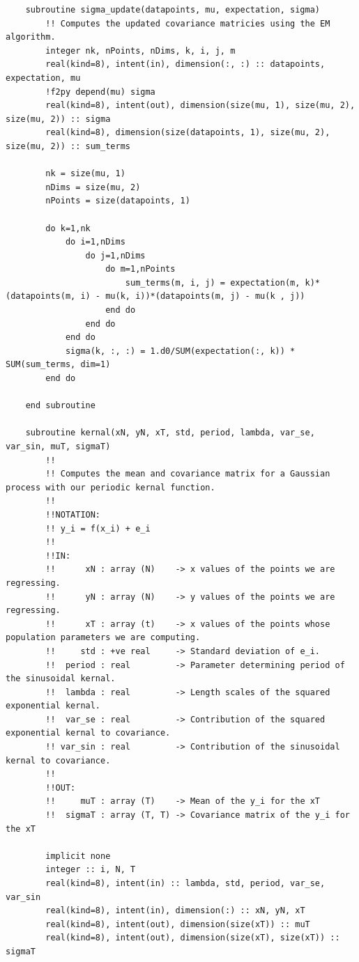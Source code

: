 \documentclass[a4paper]{article}
\begin{document}
\begin{verbatim}
    subroutine sigma_update(datapoints, mu, expectation, sigma)
        !! Computes the updated covariance matricies using the EM algorithm.
        integer nk, nPoints, nDims, k, i, j, m
        real(kind=8), intent(in), dimension(:, :) :: datapoints, expectation, mu
        !f2py depend(mu) sigma
        real(kind=8), intent(out), dimension(size(mu, 1), size(mu, 2), size(mu, 2)) :: sigma
        real(kind=8), dimension(size(datapoints, 1), size(mu, 2), size(mu, 2)) :: sum_terms

        nk = size(mu, 1)
        nDims = size(mu, 2)
        nPoints = size(datapoints, 1)

        do k=1,nk
            do i=1,nDims
                do j=1,nDims
                    do m=1,nPoints
                        sum_terms(m, i, j) = expectation(m, k)*(datapoints(m, i) - mu(k, i))*(datapoints(m, j) - mu(k , j))
                    end do
                end do
            end do
            sigma(k, :, :) = 1.d0/SUM(expectation(:, k)) * SUM(sum_terms, dim=1)
        end do
    
    end subroutine

    subroutine kernal(xN, yN, xT, std, period, lambda, var_se, var_sin, muT, sigmaT)
        !!
        !! Computes the mean and covariance matrix for a Gaussian process with our periodic kernal function.
        !!
        !!NOTATION:
        !! y_i = f(x_i) + e_i
        !!
        !!IN:
        !!      xN : array (N)    -> x values of the points we are regressing.
        !!      yN : array (N)    -> y values of the points we are regressing.
        !!      xT : array (t)    -> x values of the points whose population parameters we are computing.
        !!     std : +ve real     -> Standard deviation of e_i.
        !!  period : real         -> Parameter determining period of the sinusoidal kernal.
        !!  lambda : real         -> Length scales of the squared exponential kernal.
        !!  var_se : real         -> Contribution of the squared exponential kernal to covariance.
        !! var_sin : real         -> Contribution of the sinusoidal kernal to covariance.
        !!
        !!OUT:
        !!     muT : array (T)    -> Mean of the y_i for the xT
        !!  sigmaT : array (T, T) -> Covariance matrix of the y_i for the xT
        
        implicit none
        integer :: i, N, T
        real(kind=8), intent(in) :: lambda, std, period, var_se, var_sin
        real(kind=8), intent(in), dimension(:) :: xN, yN, xT
        real(kind=8), intent(out), dimension(size(xT)) :: muT
        real(kind=8), intent(out), dimension(size(xT), size(xT)) :: sigmaT


\end{verbatim}
\end{document}
